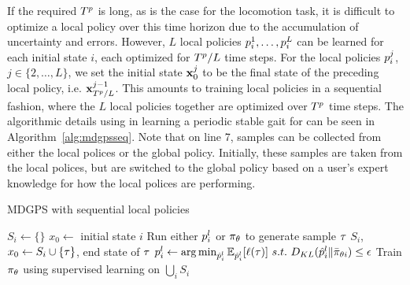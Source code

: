 If the required $T^{p}$ is long, as is the case for the \SB{} locomotion
task, it is difficult to optimize a local policy over this time horizon due to
the accumulation of uncertainty and errors. 
However, $L$ local policies $p_i^1,\ldots,p_i^L$ can be learned for each
initial state $i$, each optimized for $T^{p}/L$ time steps. For the
local policies $p_i^j$, $j\in\{2,\ldots,L\}$, we set the initial state
$\mathbf{x}_0^j$ to be the final state of the preceding local policy, i.e.
$\mathbf{x}_{T^{p}/L}^{j-1}$. This amounts to training local policies in a
sequential fashion, where the $L$ local policies together are optimized over
$T^{p}$ time steps.
The algorithmic details using in learning a periodic stable gait for \SB{} can be seen in Algorithm~\ref{alg:mdgpsseq}.
Note that on line 7, samples can be collected from either the local polices or the global policy.
Initially, these samples are taken from the local polices, but are switched to the global policy based on a user's expert knowledge for how the local polices are performing.


\setlength{\textfloatsep}{12pt}
\begin{algorithm}[tb]
    \caption{MDGPS with sequential local policies}
    \label{alg:mdgpsseq}
    \begin{algorithmic}[1]
                \STATE $S_i\leftarrow\{\}$
                    \STATE $x_0\leftarrow$ initial state $i$
                        \STATE Run either $p_i^l$ or $\pi_{\theta}$ to
                        generate sample $\tau$
                        \STATE $S_i$, $x_0\leftarrow{S_i}\cup\{\tau\}$, end state of $\tau$
                    \ENDFOR
                \ENDFOR
                    \STATE $p_i^l\leftarrow\operatorname*{arg\,min}_{\hat{p}_i^l}\mathbb{E}_{\hat{p}_i^l}[\ell(\tau)]~s.t.~D_{KL}(\hat{p}_i^l\|\bar{\pi}_{\theta{i}})\leq\epsilon$
                \ENDFOR
            \ENDFOR
            \STATE Train $\pi_{\theta}$ using supervised learning on
            $\bigcup_iS_i$
        \ENDFOR
    \end{algorithmic}
\end{algorithm}

